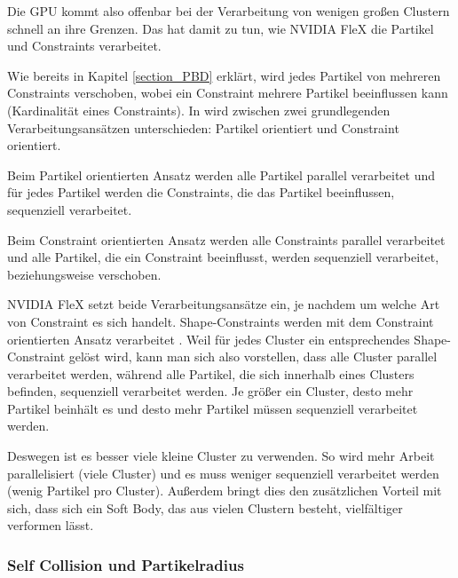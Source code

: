 
Die GPU kommt also offenbar bei der Verarbeitung von wenigen großen Clustern schnell an ihre Grenzen. Das hat damit zu tun, wie NVIDIA FleX die Partikel und Constraints verarbeitet. 

Wie bereits in Kapitel \ref{section_PBD} erklärt, wird jedes Partikel von mehreren Constraints verschoben, wobei ein Constraint mehrere Partikel beeinflussen kann (Kardinalität eines Constraints). In \cite{UPP} wird zwischen zwei grundlegenden Verarbeitungsansätzen unterschieden: Partikel orientiert und Constraint orientiert. 

Beim Partikel orientierten Ansatz werden alle Partikel parallel verarbeitet und für jedes Partikel werden die Constraints, die das Partikel beeinflussen, sequenziell verarbeitet. 

Beim Constraint orientierten Ansatz werden alle Constraints parallel verarbeitet und alle Partikel, die ein Constraint beeinflusst, werden sequenziell verarbeitet, beziehungsweise verschoben. 

NVIDIA FleX setzt beide Verarbeitungsansätze ein, je nachdem um welche Art von Constraint es sich handelt. Shape-Constraints werden mit dem Constraint orientierten Ansatz verarbeitet \cite{FlexD3D}. Weil für jedes Cluster ein entsprechendes Shape-Constraint gelöst wird, kann man sich also vorstellen, dass alle Cluster parallel verarbeitet werden, während alle Partikel, die sich innerhalb eines Clusters befinden, sequenziell verarbeitet werden. Je größer ein Cluster, desto mehr Partikel beinhält es und desto mehr Partikel müssen sequenziell verarbeitet werden. 

Deswegen ist es besser viele kleine Cluster zu verwenden. So wird mehr Arbeit parallelisiert (viele Cluster) und es muss weniger sequenziell verarbeitet werden (wenig Partikel pro Cluster). Außerdem bringt dies den zusätzlichen Vorteil mit sich, dass sich ein Soft Body, das aus vielen Clustern besteht, vielfältiger verformen lässt.



\subsubsection{Self Collision und Partikelradius}


